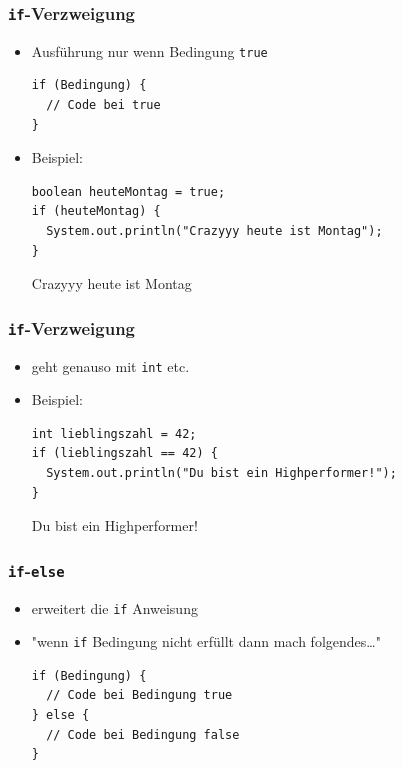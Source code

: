 \documentclass{../../presentation}
\begin{document}
\begin{frame}[fragile]
	\frametitle{\texttt{if}-Verzweigung}
	\pause
	\begin{itemize}
		\item Ausführung nur wenn Bedingung \texttt{true}
		      \pause
		      \begin{verbatim}
if (Bedingung) {
  // Code bei true
}
      \end{verbatim}
		      \pause
		\item Beispiel:
		      \begin{verbatim}
boolean heuteMontag = true;
if (heuteMontag) {
  System.out.println("Crazyyy heute ist Montag");
}
      \end{verbatim}
		      \pause
		      \begin{ausgabe}
			      Crazyyy heute ist Montag
		      \end{ausgabe}
	\end{itemize}
\end{frame}

\begin{frame}[fragile]
	\frametitle{\texttt{if}-Verzweigung}
	\pause
	\begin{itemize}
		\item geht genauso mit \texttt{int} etc.
		      \pause
		\item Beispiel:
		      \begin{verbatim}
int lieblingszahl = 42;
if (lieblingszahl == 42) {
  System.out.println("Du bist ein Highperformer!");
}
      \end{verbatim}
		      \pause
		      \begin{ausgabe}
			      Du bist ein Highperformer!
		      \end{ausgabe}
	\end{itemize}
\end{frame}

\begin{frame}[fragile]
	\frametitle{\texttt{if}-\texttt{else}}
	\pause
	\begin{itemize}
		\item erweitert die \texttt{if} Anweisung
		      \pause
		\item "wenn \texttt{if} Bedingung nicht erfüllt dann mach folgendes\dots"
		      \pause
		      \begin{verbatim}
if (Bedingung) {
  // Code bei Bedingung true
} else {
  // Code bei Bedingung false
}
\end{verbatim}
	\end{itemize}
\end{frame}
\end{document}
